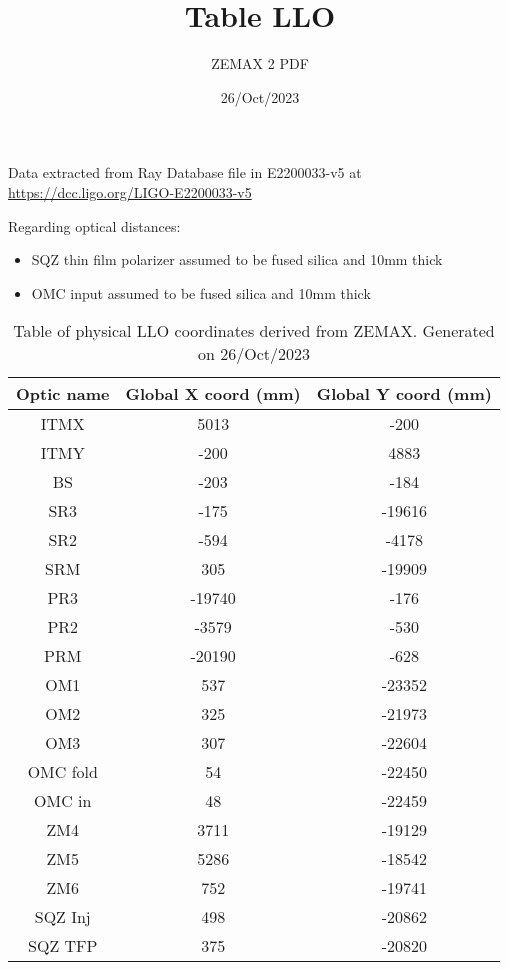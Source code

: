 \documentclass{article}
\title{Table LLO}
\author{ZEMAX 2 PDF }
\date{26/Oct/2023}
\begin{document}
\maketitle


Data extracted from Ray Database file in E2200033-v5 at \url{https://dcc.ligo.org/LIGO-E2200033-v5}


 Regarding optical distances:
\begin{itemize} 
 \item SQZ thin film polarizer assumed to be fused silica and 10mm thick
 \item OMC input assumed to be fused silica and 10mm thick
\end{itemize}

\begin{table}[h!] 
\centering 
\begin{tabular}{| c| c | c |} 
\hline \bf{Optic name} & \bf{Global X coord (mm)} & \bf{Global Y coord (mm)} \\ \hline 
ITMX & 5013 & -200\\ 
ITMY & -200 & 4883\\ 
BS & -203 & -184\\ 
SR3 & -175 & -19616\\ 
SR2 & -594 & -4178\\ 
SRM & 305 & -19909\\ 
PR3 & -19740 & -176\\ 
PR2 & -3579 & -530\\ 
PRM & -20190 & -628\\ 
OM1 & 537 & -23352\\ 
OM2 & 325 & -21973\\ 
OM3 & 307 & -22604\\ 
OMC fold & 54 & -22450\\ 
OMC in & 48 & -22459\\ 
ZM4 & 3711 & -19129\\ 
ZM5 & 5286 & -18542\\ 
ZM6 & 752 & -19741\\ 
SQZ Inj & 498 & -20862\\ 
SQZ TFP & 375 & -20820\\ 
\hline 
\end{tabular} 
\caption{Table of physical LLO coordinates derived from ZEMAX. Generated on 26/Oct/2023}
\end{table} 
\end{document}
